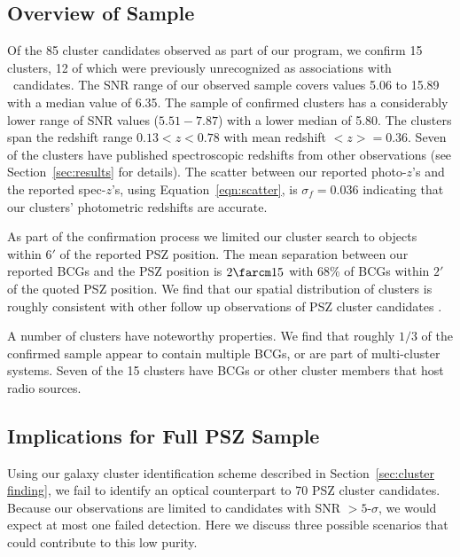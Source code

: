 \documentclass[apj, revtex4-1]{emulateapj}
\begin{document}
\subsection{Overview of Sample}
Of the 85 cluster candidates observed as part of our program, we confirm 15 clusters, 12 of which were previously unrecognized as associations with \planck\ candidates. The SNR range of our observed sample covers values 5.06 to 15.89 with a median value of 6.35. The sample of confirmed clusters has a considerably lower range of SNR values ($5.51 - 7.87$) with a lower median of 5.80. The clusters span the redshift range $ 0.13 < z < 0.78$ with mean redshift $<z> = 0.36$. Seven of the clusters have published spectroscopic redshifts from other observations (see Section~\ref{sec:results} for details). The scatter between our reported photo-$z$'s and the reported spec-$z$'s, using Equation~\ref{eqn:scatter}, is $\sigma_f = 0.036$ indicating that our clusters' photometric redshifts are accurate.

As part of the confirmation process we limited our cluster search to objects within $6'$ of the reported PSZ position. The mean separation between our reported BCGs and the PSZ position is $2\farcm15$ with 68\% of BCGs within $2'$ of the quoted PSZ position. We find that our spatial distribution of clusters is roughly consistent with other follow up observations of PSZ cluster candidates .

A number of clusters have noteworthy properties. We find that roughly $1/3$ of the confirmed sample appear to contain multiple BCGs, or are part of multi-cluster systems. Seven of the 15 clusters have BCGs or other cluster members that host radio sources.

\subsection{Implications for Full PSZ Sample}
Using our galaxy cluster identification scheme described in Section~\ref{sec:cluster finding}, we fail to identify an optical counterpart to 70 PSZ cluster candidates. Because our observations are limited to candidates with SNR $>5$-$\sigma$, we would expect at most one failed detection. Here we discuss three possible scenarios that could contribute to this low purity.
\end{document}
